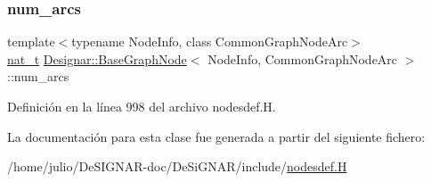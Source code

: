 \mbox{\label{class_designar_1_1_base_graph_node_a035347b8e1ffaca5df73b42bef300e0f}} 
\subsubsection{\texorpdfstring{num\+\_\+arcs}{num\_arcs}}
{\footnotesize\ttfamily template$<$typename Node\+Info, class Common\+Graph\+Node\+Arc$>$ \\
\hyperlink{namespace_designar_aa72662848b9f4815e7bf31a7cf3e33d1}{nat\+\_\+t} \hyperlink{class_designar_1_1_base_graph_node}{Designar\+::\+Base\+Graph\+Node}$<$ Node\+Info, Common\+Graph\+Node\+Arc $>$\+::num\+\_\+arcs\hspace{0.3cm}{\ttfamily [protected]}}



Definición en la línea 998 del archivo nodesdef.\+H.



La documentación para esta clase fue generada a partir del siguiente fichero\+:\begin{DoxyCompactItemize}
\item 
/home/julio/\+De\+S\+I\+G\+N\+A\+R-\/doc/\+De\+Si\+G\+N\+A\+R/include/\hyperlink{nodesdef_8_h}{nodesdef.\+H}\end{DoxyCompactItemize}
